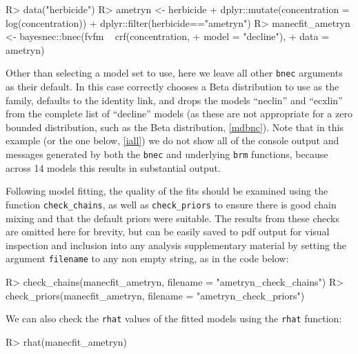 \documentclass[
  shortnames]{jss}
\begin{document}
\begin{CodeChunk}
\begin{CodeInput}
R> data("herbicide")
R> ametryn <- herbicide %
+   dplyr::mutate(concentration = log(concentration)) %
+   dplyr::filter(herbicide=="ametryn")
R> manecfit_ametryn <- bayesnec::bnec(fvfm ~ crf(concentration, 
+                                    model = "decline"), 
+                                    data = ametryn)
\end{CodeInput}
\end{CodeChunk}

Other than selecting a model set to use, here we leave all other \texttt{bnec} arguments as their default. In this case  correctly chooses a Beta distribution to use as the family, defaults to the identity link, and drops the models ``neclin'' and ``ecxlin'' from the complete list of ``decline'' models (as these are not appropriate for a zero bounded distribution, such as the Beta distribution, \ref{mdbnc}). Note that in this example (or the one below, \ref{iall}) we do not show all of the console output and messages generated by both the \texttt{bnec} and underlying \texttt{brm} functions, because across 14 models this results in substantial output.

Following model fitting, the quality of the fits should be examined using the function \texttt{check\_chains}, as well as \texttt{check\_priors} to ensure there is good chain mixing and that the default priors were suitable. The results from these checks are omitted here for brevity, but can be easily saved to pdf output for visual inspection and inclusion into any analysis supplementary material by setting the argument \texttt{filename} to any non empty string, as in the code below:

\begin{CodeChunk}
\begin{CodeInput}
R> check_chains(manecfit_ametryn, filename = "ametryn_check_chains")
R> check_priors(manecfit_ametryn, filename = "ametryn_check_priors")
\end{CodeInput}
\end{CodeChunk}

We can also check the \texttt{rhat} values of the fitted models using the \texttt{rhat} function:

\begin{CodeChunk}
\begin{CodeInput}
R> rhat(manecfit_ametryn)
\end{CodeInput}
\end{CodeChunk}
\end{document}
